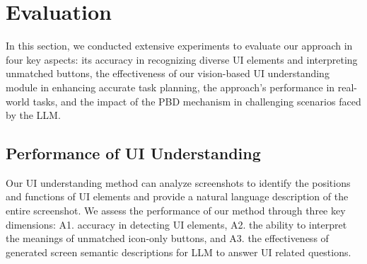 \section{Evaluation}
In this section, we conducted extensive experiments to evaluate our approach in four key aspects: its accuracy in recognizing diverse UI elements and interpreting unmatched buttons, the effectiveness of our vision-based UI understanding module in enhancing accurate task planning, the approach's performance in real-world tasks, and the impact of the PBD mechanism in challenging scenarios faced by the LLM.
\subsection{Performance of UI Understanding}
\label{sec:7_1}


Our UI understanding method can analyze screenshots to identify the positions and functions of UI elements and provide a natural language description of the entire screenshot. We assess the performance of our method through three key dimensions: A1. accuracy in detecting UI elements, A2. the ability to interpret the meanings of unmatched icon-only buttons, and A3. the effectiveness of generated screen semantic descriptions for LLM to answer UI related questions. 

